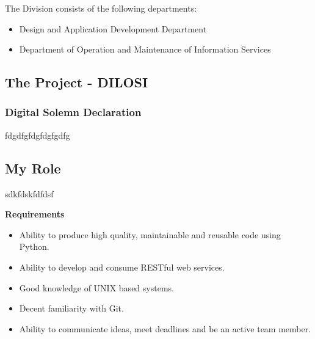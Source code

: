 The Division consists of the following departments:
\begin{itemize}
	
	\item Design and Application Development Department
	
	\item Department of Operation and Maintenance of Information Services
\end{itemize}

\subsection{The Project - DILOSI}
\subsubsection{Digital Solemn Declaration}
fdgdfgfdgfdgfgdfg


\subsection{My Role}
sdkfdskfdfdsf

\textbf{Requirements}
\begin{itemize}
	\item Ability to produce high quality, maintainable and reusable code using Python.
	\item Ability to develop and consume RESTful web services.
	\item Good knowledge of UNIX based systems.
	\item Decent familiarity with Git.
	\item Ability to communicate ideas, meet deadlines and be an active team member.
\end{itemize}